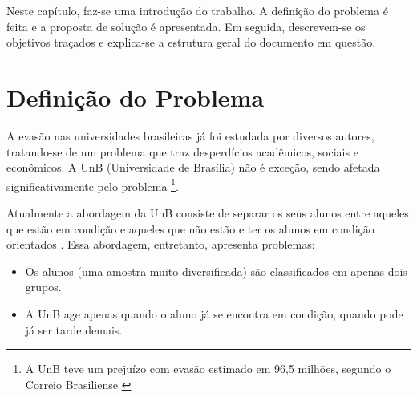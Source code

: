 Neste capítulo, faz-se uma introdução do trabalho. A definição do problema é feita e
a proposta de solução é apresentada. Em seguida, descrevem-se os objetivos traçados e
explica-se a estrutura geral do documento em questão. 

\section{Definição do Problema}
A evasão nas universidades brasileiras já foi estudada por diversos autores,
tratando-se de um problema que traz desperdícios acadêmicos, sociais e econômicos.
A UnB (Universidade de Brasília) não é exceção, sendo afetada significativamente pelo
problema \footnote{A UnB teve um prejuízo com evasão estimado em 96,5 milhões,
segundo o Correio Brasiliense \cite{correio}}.

\par Atualmente a abordagem da UnB consiste de separar os seus alunos entre aqueles
que estão em condição e aqueles que não estão e ter os alunos em condição orientados
    \cite{manual_calouro}. Essa abordagem, entretanto, apresenta problemas:
    \begin{itemize}
        \item Os alunos (uma amostra muito diversificada) são classificados em apenas
    dois grupos.
        \item A UnB age apenas quando o aluno já se encontra em condição, quando pode
    já ser tarde demais.
    \end{itemize}

